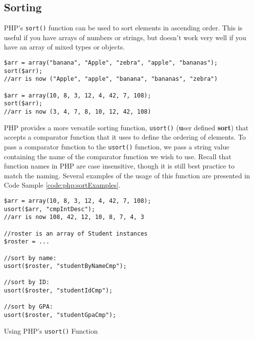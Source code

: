 \subsection{Sorting}

PHP's \texttt{sort()} function can be used to sort elements
in ascending order.  This is useful if you have arrays of numbers or
strings, but doesn't work very well if you have an array of mixed types
or objects.  

\begin{verbatim}
$arr = array("banana", "Apple", "zebra", "apple", "bananas");
sort($arr);
//arr is now ("Apple", "apple", "banana", "bananas", "zebra")

$arr = array(10, 8, 3, 12, 4, 42, 7, 108);
sort($arr);
//arr is now (3, 4, 7, 8, 10, 12, 42, 108)
\end{verbatim}

PHP provides a more versatile sorting function, \texttt{usort()}
(\textbf{u}ser defined \textbf{sort}) that accepts a comparator function that
it uses to define the ordering of elements.  To pass a comparator function
to the \texttt{usort()} function, we pass a string value containing
the name of the comparator function we wish to use.  Recall that function
names in PHP are case insensitive, though it is still best practice to
match the naming. Several examples of the usage 
of this function are presented in Code Sample \ref{code:php:sortExamples}.

\begin{listing}[H]
\begin{verbatim}
$arr = array(10, 8, 3, 12, 4, 42, 7, 108);
usort($arr, "cmpIntDesc");
//arr is now 108, 42, 12, 10, 8, 7, 4, 3

//roster is an array of Student instances
$roster = ...

//sort by name:
usort($roster, "studentByNameCmp");

//sort by ID:
usort($roster, "studentIdCmp");

//sort by GPA:
usort($roster, "studentGpaCmp");
\end{verbatim}
\caption{Using PHP's \texttt{usort()} Function}
\label{code:php:sortExamples}
\end{listing}


